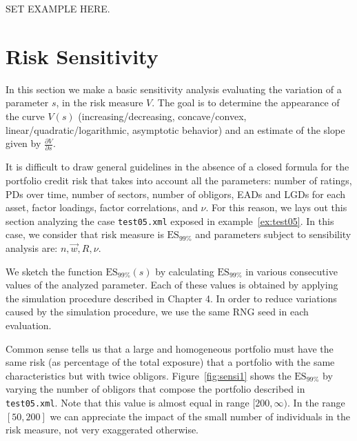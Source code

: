 \documentclass[11pt,fleqn]{book} %
\begin{document}

\begin{example}
	SET EXAMPLE HERE.
\end{example}

\section{Risk Sensitivity}

In this section we make a basic sensitivity analysis evaluating the variation 
of a parameter $s$, in the risk measure $V$. The goal is to determine the 
appearance of the curve $V(s)$ (increasing/decreasing, concave/convex, 
linear/quadratic/logarithmic, asymptotic behavior) and an estimate of the 
slope given by $\frac{\partial V}{\partial s}$.

It is difficult to draw general guidelines in the absence of a closed formula 
for the portfolio credit risk that takes into account all the parameters: 
number of ratings, PDs over time, number of sectors, number of obligors, EADs 
and LGDs for each asset, factor loadings, factor correlations, and $\nu$. For 
this reason, we lays out this section analyzing the case \texttt{test05.xml} 
exposed in example~\ref{ex:test05}. In this case, we consider that risk 
measure is $\text{ES}_{99\%}$ and parameters subject to sensibility analysis 
are: $n, \vec{w}, R, \nu$.

We sketch the function $\text{ES}_{99\%}(s)$ by calculating $\text{ES}_{99\%}$ 
in various consecutive values of the analyzed parameter. Each of these values 
is obtained by applying the simulation procedure described in Chapter 4. 
In order to reduce variations caused by the simulation procedure, we use the 
same RNG seed in each evaluation.

\begin{example}
	Common sense tells us that a large and homogeneous portfolio must have the 
	same risk (as percentage of the total exposure) that a portfolio with the 
	same characteristics but with twice obligors. Figure~\ref{fig:sensi1}
	shows the $\text{ES}_{99\%}$ by varying the number of obligors that 
	compose the portfolio described in \texttt{test05.xml}. Note that this
	value is almost equal in range $[200,\infty)$. In the range $[50,200]$
	we can appreciate the impact of the small number of individuals in the 
	risk measure, not very exaggerated otherwise.
\end{example}
\end{document}
